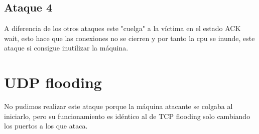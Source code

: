 \documentclass[11pt]{article}
\begin{document}
    \subsection{Ataque 4}
      \par
      A diferencia de los otros ataques este "cuelga" a la víctima en el estado
      ACK wait, esto hace que las conexiones no se cierren y por tanto la cpu
      se inunde, este ataque si consigue inutilizar la máquina.

  \section{UDP flooding}
    \par
    No pudimos realizar este ataque porque la máquina atacante se colgaba al
    iniciarlo, pero su funcionamiento es idéntico al de TCP flooding solo
    cambiando los puertos a los que ataca.
\end{document}
